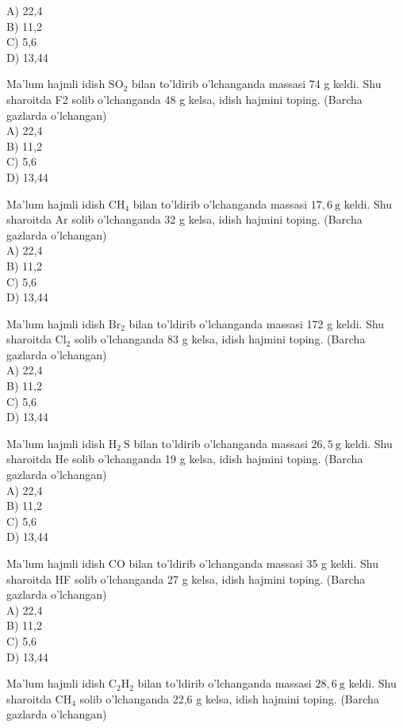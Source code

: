 A) 22,4\\
B) 11,2\\
C) 5,6\\
D) 13,44
  \item Ma'lum hajmli idish $\mathrm{SO}_{2}$ bilan to'ldirib o'lchanganda massasi 74 g keldi. Shu sharoitda F2 solib o'lchanganda 48 g kelsa, idish hajmini toping. (Barcha gazlarda o'lchangan)\\
A) 22,4\\
B) 11,2\\
C) 5,6\\
D) 13,44
  \item Ma'lum hajmli idish $\mathrm{CH}_{4}$ bilan to'ldirib o'lchanganda massasi $17,6 \mathrm{~g}$ keldi. Shu sharoitda Ar solib o'lchanganda 32 g kelsa, idish hajmini toping. (Barcha gazlarda o'lchangan)\\
A) 22,4\\
B) 11,2\\
C) 5,6\\
D) 13,44
  \item Ma'lum hajmli idish $\mathrm{Br}_{2}$ bilan to'ldirib o'lchanganda massasi 172 g keldi. Shu sharoitda $\mathrm{Cl}_{2}$ solib o'lchanganda 83 g kelsa, idish hajmini toping. (Barcha gazlarda o'lchangan)\\
A) 22,4\\
B) 11,2\\
C) 5,6\\
D) 13,44
  \item Ma'lum hajmli idish $\mathrm{H}_{2} \mathrm{~S}$ bilan to'ldirib o'lchanganda massasi $26,5 \mathrm{~g}$ keldi. Shu sharoitda He solib o'lchanganda 19 g kelsa, idish hajmini toping. (Barcha gazlarda o'lchangan)\\
A) 22,4\\
B) 11,2\\
C) 5,6\\
D) 13,44
  \item Ma'lum hajmli idish CO bilan to'ldirib o'lchanganda massasi 35 g keldi. Shu sharoitda HF solib o'lchanganda 27 g kelsa, idish hajmini toping. (Barcha gazlarda o'lchangan)\\
A) 22,4\\
B) 11,2\\
C) 5,6\\
D) 13,44
  \item Ma'lum hajmli idish $\mathrm{C}_{2} \mathrm{H}_{2}$ bilan to'ldirib o'lchanganda massasi $28,6 \mathrm{~g}$ keldi. Shu sharoitda $\mathrm{CH}_{4}$ solib o'lchanganda 22,6 g kelsa, idish hajmini toping. (Barcha gazlarda o'lchangan)\\

